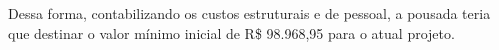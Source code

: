 \documentclass[
	12pt,				%
	openany,			%
	oneside,			%
	a4paper,			%
	english,			%
	french,				%
	spanish,			%
	brazil				%
	]{abntex2}
\begin{document}
Dessa forma, contabilizando os custos estruturais e de pessoal, a pousada teria que destinar o valor mínimo inicial de R\$ 98.968,95 para o atual projeto. 

\end{document}
